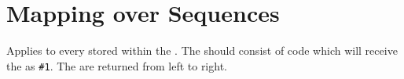 \documentclass[oneside]{book}
\begin{document}
\section{Mapping over Sequences}



\begin{function}{\SeqVarMapInline}
\begin{syntax}
  
\end{syntax}
Applies  to every  stored
within the . The  should
consist of code which will receive the  as \verb|#1|.
The  are returned from left to right.
\begin{demohigh}
\IgnoreSpacesOn
\SeqSetFromClist {}
\TlClear \lTmpaTl
\SeqVarMapInline {}
\TlUse \lTmpaTl
\IgnoreSpacesOff
\end{demohigh}
\end{function}

\end{document}
